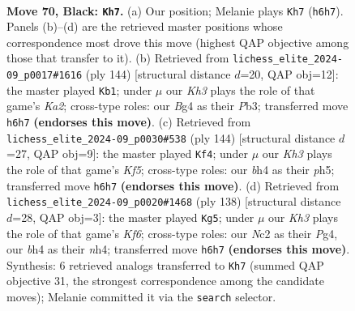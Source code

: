 \documentclass[11pt]{article}
\begin{document}
\clearpage

\begin{figure}[p]\centering
\begin{subfigure}{0.46\textwidth}\centering
\resizebox{\linewidth}{!}{%
\newchessgame
\chessboard[
  setfen={8/8/7k/8/r5bB/6R1/2n2P1K/8 b - - 1 70},
  showmover=false,
  pgfstyle=straightmove, color=movearrow, markmove={h6-h7}
]}
\caption{}
\end{subfigure}\hfill
\begin{subfigure}{0.46\textwidth}\centering
\resizebox{\linewidth}{!}{%
\newchessgame
\chessboard[
  setfen={8/8/8/8/1p1b4/1Pr5/K2k4/8 w - - 8 73},
  showmover=false,
  pgfstyle=straightmove, color=movearrow, markmove={a2-b1}
]}
\caption{}
\end{subfigure}
\\[4pt]
\begin{subfigure}{0.46\textwidth}\centering
\resizebox{\linewidth}{!}{%
\newchessgame
\chessboard[
  setfen={8/8/8/5K1p/r2B4/3R4/6k1/8 w - - 14 73},
  showmover=false,
  pgfstyle=straightmove, color=movearrow, markmove={f5-f4}
]}
\caption{}
\end{subfigure}\hfill
\begin{subfigure}{0.46\textwidth}\centering
\resizebox{\linewidth}{!}{%
\newchessgame
\chessboard[
  setfen={6k1/R7/2pB1K2/8/6Pn/5r2/8/8 w - - 28 70},
  showmover=false,
  pgfstyle=straightmove, color=movearrow, markmove={f6-g5}
]}
\caption{}
\end{subfigure}
\caption{\textbf{Move 70, Black: \texttt{Kh7}.} (a) Our position; Melanie plays \texttt{Kh7} (\texttt{h6h7}). Panels (b)--(d) are the retrieved master positions whose correspondence most drove this move (highest QAP objective among those that transfer to it). (b) Retrieved from \texttt{lichess\_elite\_2024-09\_p0017\#1616} (ply 144) [structural distance $d$=20, QAP obj=12]: the master played \texttt{Kb1}; under $\mu$ our \emph{Kh3} plays the role of that game's \emph{Ka2}; cross-type roles: our \emph{B}g4 as their \emph{P}b3; transferred move \texttt{h6h7} \textbf{(endorses this move)}. (c) Retrieved from \texttt{lichess\_elite\_2024-09\_p0030\#538} (ply 144) [structural distance $d$=27, QAP obj=9]: the master played \texttt{Kf4}; under $\mu$ our \emph{Kh3} plays the role of that game's \emph{Kf5}; cross-type roles: our \emph{b}h4 as their \emph{p}h5; transferred move \texttt{h6h7} \textbf{(endorses this move)}. (d) Retrieved from \texttt{lichess\_elite\_2024-09\_p0020\#1468} (ply 138) [structural distance $d$=28, QAP obj=3]: the master played \texttt{Kg5}; under $\mu$ our \emph{Kh3} plays the role of that game's \emph{Kf6}; cross-type roles: our \emph{N}c2 as their \emph{P}g4, our \emph{b}h4 as their \emph{n}h4; transferred move \texttt{h6h7} \textbf{(endorses this move)}. Synthesis: 6 retrieved analogs transferred to \texttt{Kh7} (summed QAP objective 31, the strongest correspondence among the candidate moves); Melanie committed it via the \texttt{search} selector.}
\label{fig:thought-m139}
\end{figure}
\end{document}
